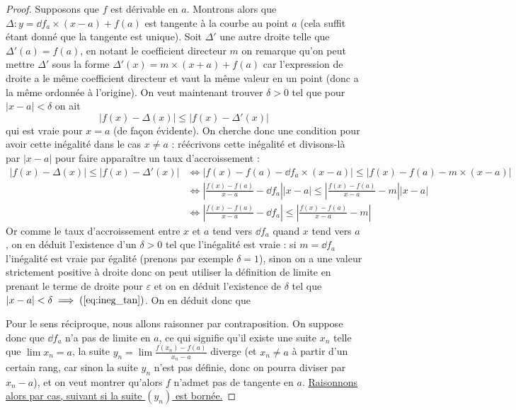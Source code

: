  \begin{proof}
    Supposons que $f$ est dérivable en $a$. Montrons alors que $\Delta : y = \dd f_a \times (x-a) + f(a)$ est tangente à la courbe au point $a$ (cela suffit étant donné que la tangente est unique). Soit $\Delta'$ une autre droite telle que $\Delta'(a)=f(a)$, en notant le coefficient directeur $m$ on remarque qu'on peut mettre $\Delta'$ sous la forme $\Delta'(x) = m\times (x+a) + f(a)$ car l'expression de droite a le même coefficient directeur et vaut la même valeur en un point (donc a la même ordonnée à l'origine). On veut maintenant trouver $\delta > 0$ tel que pour $|x-a| < \delta$ on ait \begin{equation}\label{eq:ineg_tan}|f(x) - \Delta(x)| \leq |f(x)-\Delta'(x)|\end{equation} qui est vraie pour $x = a$ (de façon évidente). On cherche donc une condition pour avoir cette inégalité dans le cas $x\neq a$ : réécrivons cette inégalité et divisons-là par $|x - a|$ pour faire apparaître un taux d'accroissement :
    \begin{align*}
        |f(x) - \Delta(x)| \leq |f(x)-\Delta'(x)| &\iff |f(x)-f(a) - \dd f_a\times(x-a)| \leq |f(x)-f(a) - m\times (x-a)|\\
        &\iff \left|\frac{f(x)-f(a)}{x-a}-\dd f_a\right||x-a| \leq \left|\frac{f(x)-f(a)}{x-a} - m\right||x-a|\\
        &\iff \left|\frac{f(x)-f(a)}{x-a}-\dd f_a\right| \leq \left|\frac{f(x)-f(a)}{x-a} - m\right|
    \end{align*}
    Or comme le taux d'accroissement entre $x$ et $a$ tend vers $\dd f_a$ quand $x$ tend vers $a$, on en déduit l'existence d'un $\delta > 0$ tel que l'inégalité est vraie : si $m = \dd f_a$ l'inégalité est vraie par égalité (prenons par exemple $\delta = 1$), sinon on a une valeur strictement positive à droite donc on peut utiliser la définition de limite en prenant le terme de droite pour $\varepsilon$ et on en déduit l'existence de $\delta$ tel que $|x-a| < \delta \implies (\ref{eq:ineg_tan})$. On en déduit donc que 

    \vspace{0.5cm}

    Pour le sens réciproque, nous allons raisonner par contraposition. On suppose donc que $\dd f_a$ n'a pas de limite en $a$, ce qui signifie qu'il existe une suite $x_n$ telle que $\lim x_n = a$, la suite $ y_n = \displaystyle{\lim \frac{f(x_n)-f(a)}{x_n-a}}$ diverge (et $x_n \neq a$ à partir d'un certain rang, car sinon la suite $y_n$ n'est pas définie, donc on pourra diviser par $x_n-a$), et on veut montrer qu'alors $f$ n'admet pas de tangente en $a$. \underline{Raisonnons alors par cas, suivant si la suite $(y_n)$ est bornée.}


\end{proof}
